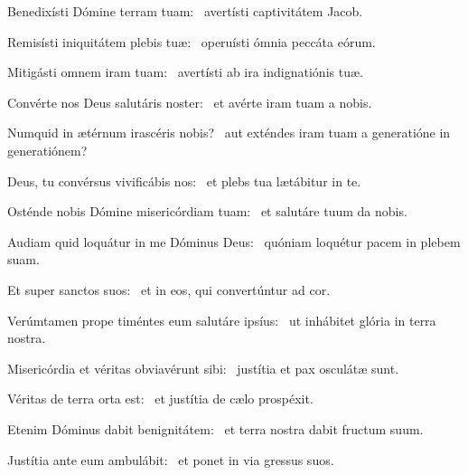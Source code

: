 \item Benedixísti Dómine terram tuam:~\psstar{} avertísti captivitátem Jacob.

\item Remisísti iniquitátem plebis tuæ:~\psstar{} operuísti ómnia peccáta eórum.

\item Mitigásti omnem iram tuam:~\psstar{} avertísti ab ira indignatiónis tuæ.

\item Convérte nos Deus salutáris noster:~\psstar{} et avérte iram tuam a nobis.

\item Numquid in ætérnum irascéris nobis?~\psstar{} aut exténdes iram tuam a generatióne in generatiónem?

\item Deus, tu convérsus vivificábis nos:~\psstar{} et plebs tua lætábitur in te.

\item Osténde nobis Dómine misericórdiam tuam:~\psstar{} et salutáre tuum da nobis.

\item Audiam quid loquátur in me Dóminus Deus:~\psstar{} quóniam loquétur pacem in plebem suam.

\item Et super sanctos suos:~\psstar{} et in eos, qui convertúntur ad cor.

\item Verúmtamen prope timéntes eum salutáre ipsíus:~\psstar{} ut inhábitet glória in terra nostra.

\item Misericórdia et véritas obviavérunt sibi:~\psstar{} justítia et pax osculátæ sunt.

\item Véritas de terra orta est:~\psstar{} et justítia de cælo prospéxit.

\item Etenim Dóminus dabit benignitátem:~\psstar{} et terra nostra dabit fructum suum.

\item Justítia ante eum ambulábit:~\psstar{} et ponet in via gressus suos.
